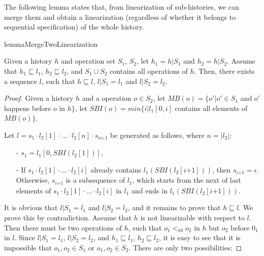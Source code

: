 The following lemma states that, from linearization of sub-histories, we can merge them and obtain a linearization (regardless of whether it belongs to sequential specification) of the whole history.

\begin{restatable}{lemma}{MergeTwoLinearization}
\label{lemma:merge two linearization}

Given a history $h$ and operation set $S_1$, $S_2$, let $h_1 = h \vert{S_1}$ and $h_2 = h \vert{S_2}$. Assume that $h_1 \sqsubseteq l_1$, $h_2 \sqsubseteq l_2$, and $S_1 \cup S_2$ contains all operations of $h$. Then, there exists a sequence $l$, such that $h \sqsubseteq l$, $l \vert{S_1} = l_1$ and $l \vert{S_2} = l_2$.
\end{restatable}

\begin {proof}

Given a history $h$ and a operation $o \in S_2$, let $\textit{MB}(o) = \{ o' \vert o' \in S_1$ and $o'$ happens before $o$ in $h \}$, let $\textit{SBI}(o) = \textit{min}\{ i \vert l_1[0,i]$ contains all elements of $\textit{MB}(o) \}$.

Let $l = s_1 \cdot l_2[1] \cdot \ldots \cdot l_2[n] \cdot s_{\textit{n+1}}$ be generated as follows, where $n = \vert l_2 \vert$:

\begin{itemize}
\setlength{\itemsep}{0.5pt}
\item[-] $s_1 = l_1[0, \textit{SBI}(l_2[1])]$,

\item[-] If $s_1 \cdot l_2[1] \cdot \ldots \cdot l_2[i]$ already contains $l_1(\textit{SBI}(l_2[\textit{i+1}]))$, then $s_{\textit{i+1}} = \epsilon$. Otherwise, $s_{\textit{i+1}}$ is a subsequence of $l_1$, which starts from the next of last elements of $s_1 \cdot l_2[1] \cdot \ldots \cdot l_2[i]$ in $l_1$ and ends in $l_1(\textit{SBI}(l_2[\textit{i+1}]))$.
\end{itemize}

It is obvious that $l \vert{S_1} = l_1$ and $l \vert{S_2} = l_2$, and it remains to prove that $h \sqsubseteq l$. We prove this by contradiction. Assume that $h$ is not linearizable with respect to $l$. Then there must be two operations of $h$, such that $o_1 <_{hb} o_2$ in $h$ but $o_2$ before $0_1$ in $l$. Since $l \vert{S_1} = l_1$, $l \vert{S_2} = l_2$, and $h_1 \sqsubseteq l_1$, $h_2 \sqsubseteq l_2$, it is easy to see that it is impossible that $o_1,o_2 \in S_1$ or $o_1,o_2 \in S_2$. There are only two possibilities:


\end{proof}
